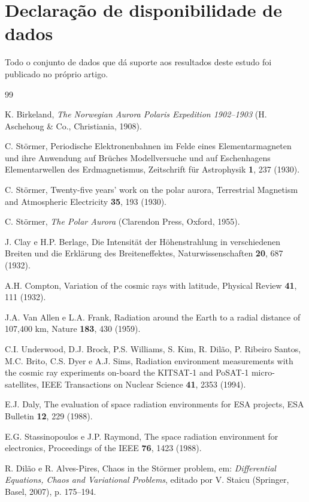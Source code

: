 \documentclass[twocolumn]{rbef}
\begin{document}
\section*{Declaração de disponibilidade de dados}

Todo o conjunto de dados que dá suporte aos resultados deste estudo foi publicado no próprio artigo.

\begin{thebibliography}{99}

 K. Birkeland, \textit{The Norwegian Aurora Polaris Expedition 1902--1903} (H. Aschehoug \& Co., Christiania, 1908).

 C. Störmer, Periodische Elektronenbahnen im Felde eines Elementarmagneten und ihre Anwendung auf Brüches Modellversuche und auf Eschenhagens Elementarwellen des Erdmagnetismus, Zeitschrift für Astrophysik \textbf{1}, 237 (1930).

 C. Störmer, Twenty-five years' work on the polar aurora, Terrestrial Magnetism and Atmospheric Electricity \textbf{35}, 193 (1930).

 C. Störmer, \textit{The Polar Aurora} (Clarendon Press, Oxford, 1955).

 J. Clay e H.P. Berlage, Die Intensität der Höhenstrahlung in verschiedenen Breiten und die Erklärung des Breiteneffektes, Naturwissenschaften \textbf{20}, 687 (1932).

 A.H. Compton, Variation of the cosmic rays with latitude, Physical Review \textbf{41}, 111 (1932).

 J.A. Van Allen e L.A. Frank, Radiation around the Earth to a radial distance of 107,400 km, Nature \textbf{183}, 430 (1959).

 C.I. Underwood, D.J. Brock, P.S. Williams, S. Kim, R. Dilão, P. Ribeiro Santos, M.C. Brito, C.S. Dyer e A.J. Sims, Radiation environment measurements with the cosmic ray experiments on-board the KITSAT-1 and PoSAT-1 micro-satellites, IEEE Transactions on Nuclear Science \textbf{41}, 2353 (1994).

 E.J. Daly, The evaluation of space radiation environments for ESA projects, ESA Bulletin \textbf{12}, 229 (1988).

 E.G. Stassinopoulos e J.P. Raymond, The space radiation environment for electronics, Proceedings of the IEEE \textbf{76}, 1423 (1988).

 R. Dilão e R. Alves-Pires, Chaos in the Störmer problem, em: \textit{Differential Equations, Chaos and Variational Problems}, editado por V. Staicu (Springer, Basel, 2007), p. 175--194.


\end{thebibliography}
\end{document}
